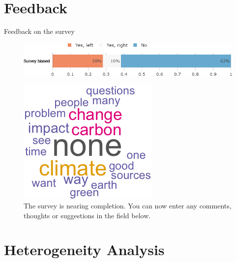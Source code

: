 \documentclass[aspectratio=169,9pt,dvipsnames]{beamer}
\begin{document}
\section{Feedback}
\begin{frame}{Feedback on the survey}%
\vspace{-.2cm}
\begin{figure}[h!]
\caption{Do you feel that this survey was politically biased?}
\includegraphics[width=.6\textwidth]{../figures/US/survey_biased_US.png} \\
\vspace{.5cm}
\caption{The survey is nearing completion. You can now enter any comments, thoughts or suggestions in the field below.}
\includegraphics[width=.3\textwidth]{../figures/US/cloud_comment.png}
\end{figure}
\end{frame}

\section{Heterogeneity Analysis}
\end{document}
